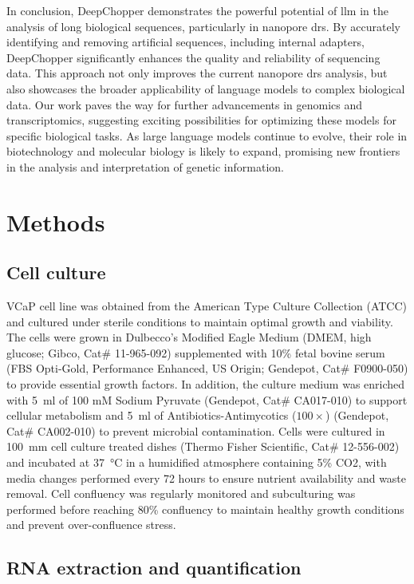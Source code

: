 \documentclass[pdflatex,sn-nature, lineno]{sn-jnl}%
\theoremstyle{thmstyleone}%
\theoremstyle{thmstyletwo}%
\theoremstyle{thmstylethree}%
\begin{document}
In conclusion, DeepChopper demonstrates the powerful potential of \gls{llm} in the analysis of long biological sequences, particularly in nanopore \gls{drs}.
By accurately identifying and removing artificial sequences, including internal adapters, DeepChopper significantly enhances the quality and reliability of sequencing data.
This approach not only improves the current nanopore \gls{drs} analysis, but also showcases the broader applicability of language models to complex biological data.
Our work paves the way for further advancements in genomics and transcriptomics, suggesting exciting possibilities for optimizing these models for specific biological tasks.
As large language models continue to evolve, their role in biotechnology and molecular biology is likely to expand, promising new frontiers in the analysis and interpretation of genetic information.

\section{Methods}\label{sec:methods}

\subsection{Cell culture}

VCaP cell line was obtained from the American Type Culture Collection (ATCC) and cultured under sterile conditions to maintain optimal growth and viability.
The cells were grown in Dulbecco's Modified Eagle Medium (DMEM, high glucose; Gibco, Cat\# 11-965-092) supplemented with 10\% fetal bovine serum (FBS Opti-Gold, Performance Enhanced, US Origin; Gendepot, Cat\# F0900-050) to provide essential growth factors.
In addition, the culture medium was enriched with \SI{5}{\ml} of 100 mM Sodium Pyruvate (Gendepot, Cat\# CA017-010) to support cellular metabolism and \SI{5}{\ml} of Antibiotics-Antimycotics (\( 100\times \)) (Gendepot, Cat\# CA002-010) to prevent microbial contamination.
Cells were cultured in \SI{100}{\mm} cell culture treated dishes (Thermo Fisher Scientific, Cat\# 12-556-002) and incubated at \SI{37}{\degreeCelsius} in a humidified atmosphere containing 5\% CO2, with media changes performed every 72 hours to ensure nutrient availability and waste removal.
Cell confluency was regularly monitored and subculturing was performed before reaching 80\% confluency to maintain healthy growth conditions and prevent over-confluence stress.

\subsection{RNA extraction and quantification}
\end{document}
